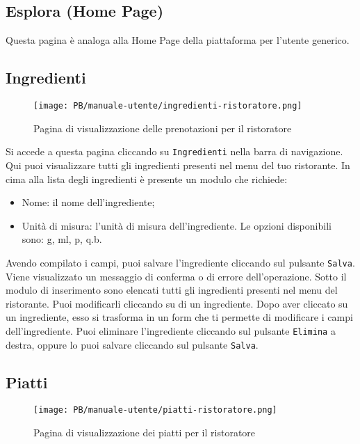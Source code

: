 \subsection{Esplora (Home Page)}

Questa pagina è analoga alla Home Page della piattaforma per l'utente generico.

\subsection{Ingredienti}

\begin{figure}[htbp]
    \centering
	\texttt{[image: PB/manuale-utente/ingredienti-ristoratore.png]}
    \caption{Pagina di visualizzazione delle prenotazioni per il ristoratore}
\end{figure}

Si accede a questa pagina cliccando su \texttt{Ingredienti} nella barra di
navigazione. Qui puoi visualizzare tutti gli ingredienti presenti nel menu del
tuo ristorante. In cima alla lista degli ingredienti è presente un modulo che
richiede:
\begin{itemize}
	\item Nome: il nome dell'ingrediente;
	\item Unità di misura: l'unità di misura dell'ingrediente. Le opzioni
		disponibili sono: g, ml, p, q.b.
\end{itemize}

Avendo compilato i campi, puoi salvare l'ingrediente cliccando sul pulsante
\texttt{Salva}. Viene visualizzato un messaggio di conferma o di errore
dell'operazione. Sotto il modulo di inserimento sono elencati tutti gli
ingredienti presenti nel menu del ristorante. Puoi modificarli cliccando su di
un ingrediente. Dopo aver cliccato su un ingrediente, esso si trasforma in un
form che ti permette di modificare i campi dell'ingrediente. Puoi eliminare
l'ingrediente cliccando sul pulsante \texttt{Elimina} a destra, oppure lo puoi
salvare cliccando sul pulsante \texttt{Salva}.

\subsection{Piatti}

\begin{figure}[htbp]
    \centering
	\texttt{[image: PB/manuale-utente/piatti-ristoratore.png]}
    \caption{Pagina di visualizzazione dei piatti per il ristoratore}
\end{figure}

